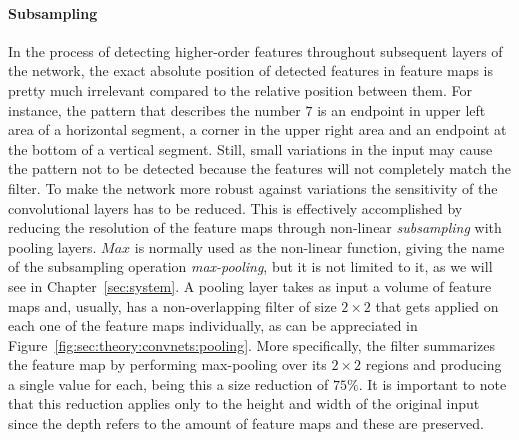 \paragraph{Subsampling}
In the process of detecting higher-order features throughout subsequent layers of the network, the exact absolute position of detected features in feature maps is pretty much irrelevant compared to the relative position between them.
For instance, the pattern that describes the number $7$ is an endpoint in upper left area of a horizontal segment, a corner in the upper right area and an endpoint at the bottom of a vertical segment.
Still, small variations in the input may cause the pattern not to be detected because the features will not completely match the filter.
To make the network more robust against variations the sensitivity of the convolutional layers has to be reduced.
This is effectively accomplished by reducing the resolution of the feature maps through non-linear \emph{subsampling} with pooling layers.
$Max$ is normally used as the non-linear function, giving the name of the subsampling operation \emph{max-pooling}, but it is not limited to it, as we will see in Chapter~\ref{sec:system}.
A pooling layer takes as input a volume of feature maps and, usually, has a non-overlapping filter of size ${2}\times{2}$ that gets applied on each one of the feature maps individually, as can be appreciated in Figure~\ref{fig:sec:theory:convnets:pooling}.
More specifically, the filter summarizes the feature map by performing max-pooling over its ${2}\times{2}$ regions and producing a single value for each, being this a size reduction of $75\%$.
It is important to note that this reduction applies only to the height and width of the original input since the depth refers to the amount of feature maps and these are preserved.

